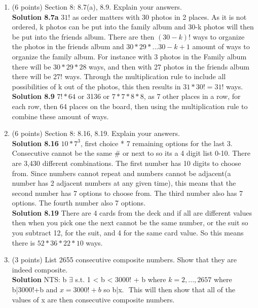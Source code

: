 \documentclass[12pt]{article}
\begin{document}
\begin{enumerate}
    \item (6 points) Section 8:  8.7(a), 8.9.  Explain your answers. \\ 
    \textbf{Solution 8.7a} $31!$ as order matters with 30 photos in 2 places. As it is not ordered, k photos can be put into the family album and 30-k photos will then be put into the friends album. There are then $(30-k)!$ ways to organize the photos in the friends album and $30*29*... 30-k+1$ amount of ways to organize the family album. For instance with 3 photos in the Family album there will be $30*29*28$ ways, and then with 27 photos in the friends album there will be 27! ways. Through the multiplication rule to include all possibilities of k out of the photos, this then results in $31*30! = 31!$ ways. \\
    
    \textbf{Solution 8.9} $7!*64$ or 3136 or $7*7*8*8$, as 7 other places in a row, for each row, then 64 places on the board, then using the multiplication rule to combine these amount of ways. \\
    
    
    \item (6 points) Section 8:   8.16, 8.19.  Explain your answers. \\ 
    \textbf{Solution 8.16}  $10*7^3$, first choice * 7 remaining options for the last 3. Consecutive cannot be the same # or next to so its a 4 digit list 0-10. There are 3,430 diﬀerent combinations. The ﬁrst number has 10 digits to choose from. Since numbers cannot repeat and numbers cannot be adjacent(a number has 2 adjacent numbers at any given time), this means that the second number has 7 options to choose from. The third number also has 7 options. The fourth number also 7 options. \\
    
    
    \textbf{Solution 8.19} There are 4 cards from the deck and if all are different values then when you pick one the next cannot be the same number, or the suit so you subtract 12, for the suit, and 4 for the same card value. So this means there is $52*36*22*10$ ways. 
    
    
    
    \item (3 points) List 2655 consecutive composite numbers.  Show that they are indeed composite.  \\
    
    \textbf{Solution} NTS: b $\exists$  s.t.  1 < b < 3000! + b  where  $ k = 2, ..., 2657 $ where  b|3000!+b and $x = 3000!+b $ so b|x. $ $ This will then show that all of the values of x are then consecutive composite numbers. \\
    

\end{enumerate}
\end{document}
